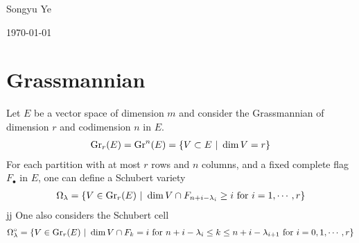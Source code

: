 \documentclass[12pt]{article}
\begin{document}
Songyu Ye

\today

\section{Grassmannian}
Let $E$ be a vector space of dimension $m$ and consider the Grassmannian of dimension $r$ and codimension $n$ in $E$.
\begin{align*}
	\operatorname{Gr}_r(E) = \operatorname{Gr}^n(E) = \{V\subset E\ \vert \  \dim V = r\}
\end{align*} For each partition with at most $r$ rows and $n$ columns, and a fixed complete flag $F_\bullet$ in $E$, one can define a Schubert variety
\begin{align*}
	\Omega_\lambda = \{V\in \operatorname{Gr}_r(E)\ \vert \  \dim V\cap F_{n+i-\lambda_i} \geq i \text{ for } i = 1, \cdots, r\}
\end{align*}jj
One also considers the Schubert cell \begin{align*}
	\Omega_\lambda^\circ = \{V\in \operatorname{Gr}_r(E)\ \vert \  \dim V\cap F_k = i \text{ for } n+i-\lambda_i \leq k \leq n+i-\lambda_{i+1} \text{ for } i = 0,1, \cdots, r\}
\end{align*}
\end{document}
